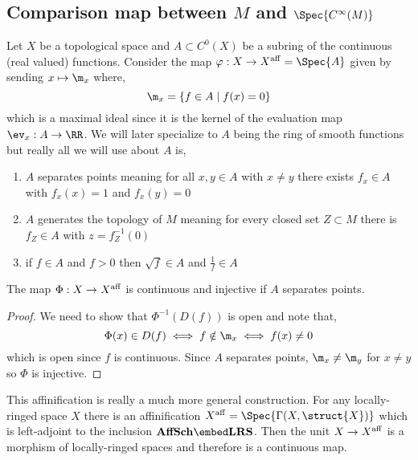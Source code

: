 \documentclass[12pt]{article}
\begin{document}
\subsection{Comparison map between $M$ and $\Spec{C^{\infty}(M)}$}

Let $X$ be a topological space and $A \subset C^0(X)$ be a subring of the continuous (real valued) functions. Consider the map $\varphi : X \to X^{\aff} = \Spec{A}$ given by sending $x \mapsto \m_x$ where,
\[ \m_x = \{ f \in A \mid f(x) = 0 \} \]
which is a maximal ideal since it is the kernel of the evaluation map $\ev_x : A \to \RR$. We will later specialize to $A$ being the ring of smooth functions but really all we will use about $A$ is,
\begin{enumerate}
\item $A$ separates points meaning for all $x, y \in A$ with $x \neq y$ there exists $f_x \in A$ with $f_x(x) = 1$ and $f_x(y) = 0$

\item $A$ generates the topology of $M$ meaning for every closed set $Z \subset M$ there is $f_Z \in A$ with $z = f_Z^{-1}(0)$

\item if $f \in A$ and $f > 0$ then $\sqrt{f} \in A$ and $\frac{1}{f} \in A$
\end{enumerate}

\begin{prop}
The map $\Phi : X \to X^{\mathrm{aff}}$ is continuous and injective if $A$ separates points.
\end{prop}

\begin{proof}
We need to show that $\Phi^{-1}(D(f))$ is open and note that,
\[ \Phi(x) \in D(f) \iff f \notin \m_x \iff f(x) \neq 0 \]
which is open since $f$ is continuous. Since $A$ separates points, $\m_x \neq \m_y$ for $x \neq y$ so $\Phi$ is injective.
\end{proof}

\begin{rmk}
This affinification is really a much more general construction. For any locally-ringed space $X$ there is an affinification $X^{\aff} = \Spec{\Gamma(X, \struct{X})}$ which is left-adjoint to the inclusion $\mathbf{AffSch} \embed \mathbf{LRS}$. Then the unit $X \to X^{\mathrm{aff}}$ is a morphism of locally-ringed spaces and therefore is a continuous map. 
\end{rmk}
 
\end{document}
